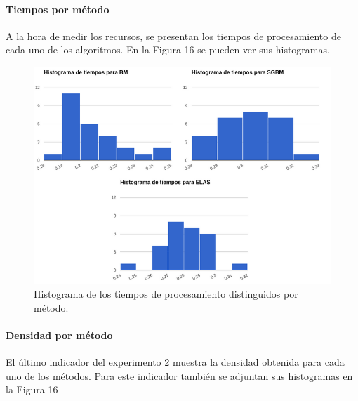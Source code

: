 \documentclass[11pt,a4paper,titlepage]{article}
\newcommand{\Figure}[1]{Figura #1}
\begin{document}
\paragraph{Tiempos por método}
\hfill \break

A la hora de medir los recursos, se presentan los tiempos de procesamiento de cada uno de los algoritmos. En la \Figure{16} se pueden ver sus histogramas.


\begin{figure}[h!]

  \centering
    \includegraphics[width=1\textwidth]{f15.png}
  \caption{Histograma de los tiempos de procesamiento distinguidos por método.}
\end{figure}

\paragraph{Densidad por método}
\hfill \break

El último indicador del experimento 2 muestra la densidad obtenida para cada uno de los métodos. Para este indicador también se adjuntan sus histogramas en la \Figure{16}

\end{document}
